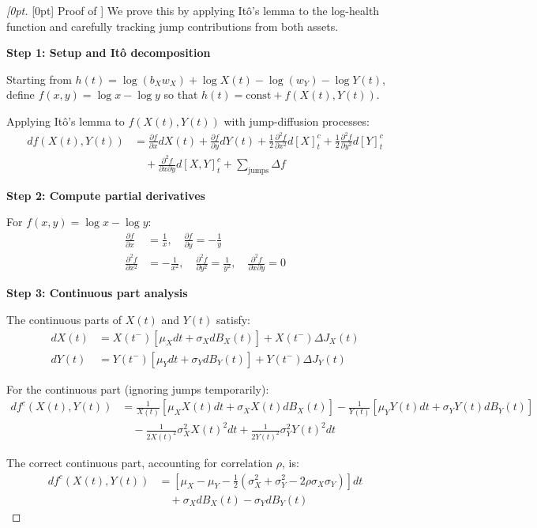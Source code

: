 \documentclass{article}
\theoremstyle{definition}
\newenvironment{delayedproof}[1]
 {\begin{proof}[\raisedtarget{#1}Proof of \Cref{#1}]}
 {\end{proof}}
\newcommand{\raisedtarget}[1]{%
  \raisebox{\fontcharht\font`P}[0pt][0pt]{\hypertarget{#1}{}}%
}
\begin{document}
\begin{delayedproof}{prop:log_health_dynamics}
We prove this by applying Itô's lemma to the log-health function and carefully tracking jump contributions from both assets.

\textbf{Step 1: Setup and Itô decomposition}

Starting from $h(t) = \log(b_X w_X) + \log X(t) - \log(w_Y) - \log Y(t)$, define $f(x,y) = \log x - \log y$ so that $h(t) = \text{const} + f(X(t), Y(t))$.

Applying Itô's lemma to $f(X(t), Y(t))$ with jump-diffusion processes:
\begin{align}
df(X(t), Y(t)) &= \frac{\partial f}{\partial x} dX(t) + \frac{\partial f}{\partial y} dY(t) + \frac{1}{2}\frac{\partial^2 f}{\partial x^2} d[X]_t^c + \frac{1}{2}\frac{\partial^2 f}{\partial y^2} d[Y]_t^c \nonumber\\
&\quad + \frac{\partial^2 f}{\partial x \partial y} d[X,Y]_t^c + \sum_{\text{jumps}} \Delta f
\end{align}

\textbf{Step 2: Compute partial derivatives}

For $f(x,y) = \log x - \log y$:
\begin{align}
\frac{\partial f}{\partial x} &= \frac{1}{x}, \quad \frac{\partial f}{\partial y} = -\frac{1}{y}\\
\frac{\partial^2 f}{\partial x^2} &= -\frac{1}{x^2}, \quad \frac{\partial^2 f}{\partial y^2} = \frac{1}{y^2}, \quad \frac{\partial^2 f}{\partial x \partial y} = 0
\end{align}

\textbf{Step 3: Continuous part analysis}

The continuous parts of $X(t)$ and $Y(t)$ satisfy:
\begin{align}
dX(t) &= X(t^-)[\mu_X dt + \sigma_X dB_X(t)] + X(t^-)\Delta J_X(t)\\
dY(t) &= Y(t^-)[\mu_Y dt + \sigma_Y dB_Y(t)] + Y(t^-)\Delta J_Y(t)
\end{align}

For the continuous part (ignoring jumps temporarily):
\begin{align}
df^c(X(t), Y(t)) &= \frac{1}{X(t)}[\mu_X X(t) dt + \sigma_X X(t) dB_X(t)] - \frac{1}{Y(t)}[\mu_Y Y(t) dt + \sigma_Y Y(t) dB_Y(t)] \nonumber\\
&\quad - \frac{1}{2X(t)^2} \sigma_X^2 X(t)^2 dt + \frac{1}{2Y(t)^2} \sigma_Y^2 Y(t)^2 dt
\end{align}

The correct continuous part, accounting for correlation $\rho$, is:
\begin{align}
df^c(X(t), Y(t)) &= [\mu_X - \mu_Y - \frac{1}{2}(\sigma_X^2 + \sigma_Y^2 - 2\rho\sigma_X\sigma_Y)] dt \nonumber\\
&\quad + \sigma_X dB_X(t) - \sigma_Y dB_Y(t)
\end{align}


\end{delayedproof}
\end{document}
